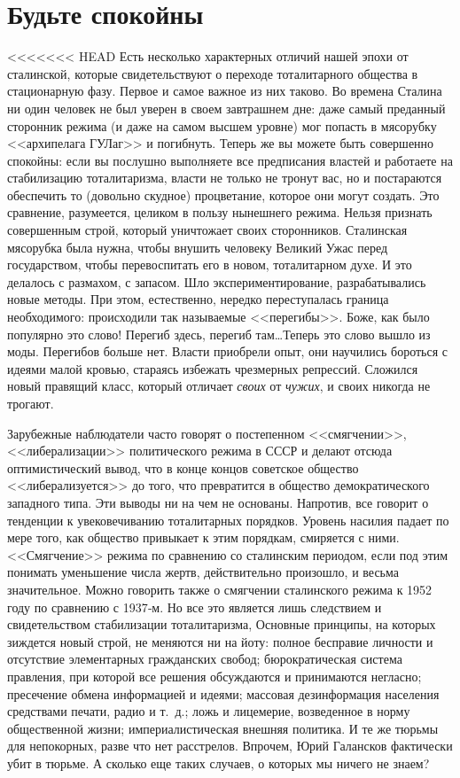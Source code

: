 \documentclass{book}
\begin{document}
\section{Будьте спокойны}

<<<<<<< HEAD
Есть несколько характерных отличий нашей эпохи от сталинской, которые свидетельствуют о переходе тоталитарного общества в стационарную фазу. Первое и самое важное из них таково. Во времена Сталина ни один человек не был уверен в своем завтрашнем дне: даже самый преданный сторонник режима (и даже на самом высшем уровне) мог попасть в мя­сорубку <<архипелага ГУЛаг>> и погибнуть. Теперь же вы мо­жете быть совершенно спокойны: если вы послушно выполня­ете все предписания властей и работаете на стабилизацию тота­литаризма, власти не только не тронут вас, но и постараются обеспечить то (довольно скудное) процветание, которое они могут создать. Это сравнение, разумеется, целиком в пользу нынешнего режима. Нельзя признать совершенным строй, который уничтожает своих сторонников. Сталинская мясорубка была нужна, чтобы внушить человеку Великий Ужас перед государством, чтобы перевоспитать его в новом, тоталитарном духе. И это делалось с размахом, с запасом. Шло экспериментирование, разрабатывались новые методы. При этом, естественно, нередко переступалась граница необходимого: происходили так называемые <<перегибы>>. Боже, как было популяр­но это слово! Перегиб здесь, перегиб там\ldots Теперь это слово вышло из моды. Перегибов больше нет. Власти приобрели опыт, они научились бороться с идеями малой кровью, стараясь избежать чрезмерных репрессий. Сложился новый правящий класс, который отличает \textit{своих} от \textit{чужих},  и своих  никогда не трогают.

Зарубежные наблюдатели часто говорят о постепенном <<смягчении>>,  <<либерализации>> политического режима в СССР и делают отсюда оптимистический вывод, что в конце концов советское общество <<либерализуется>> до того, что превратится в общество демократического западного типа. Эти выводы ни на чем не основаны. Напротив, все говорит о тенденции к увековечиванию тоталитарных порядков. Уровень насилия падает по мере того, как общество привыкает к этим порядкам, смиряется с ними. <<Смягчение>> режима по сравнению со сталинским периодом, если под этим понимать уменьшение числа жертв, действительно произошло, и весьма значительное. Можно говорить также о смягчении сталинского режима к 1952 году по сравнению с 1937‑м. Но все это является лишь следствием и свидетельством стабилизации тоталитаризма, Основные принципы, на которых зиждется новый строй, не меняются ни на йоту: полное бесправие личности и отсутствие элементарных гражданских свобод; бюрократическая систе­ма правления, при которой все решения обсуждаются и при­нимаются негласно; пресечение обмена информацией и идея­ми; массовая дезинформация населения средствами печати, радио и т.~д.; ложь и лицемерие, возведенное в норму общест­венной жизни; империалистическая внешняя политика. И те же тюрьмы для непокорных, разве что нет расстрелов. Впрочем, Юрий Галансков фактически убит в тюрьме. А сколько еще таких случаев, о которых мы ничего не знаем?
\end{document}
